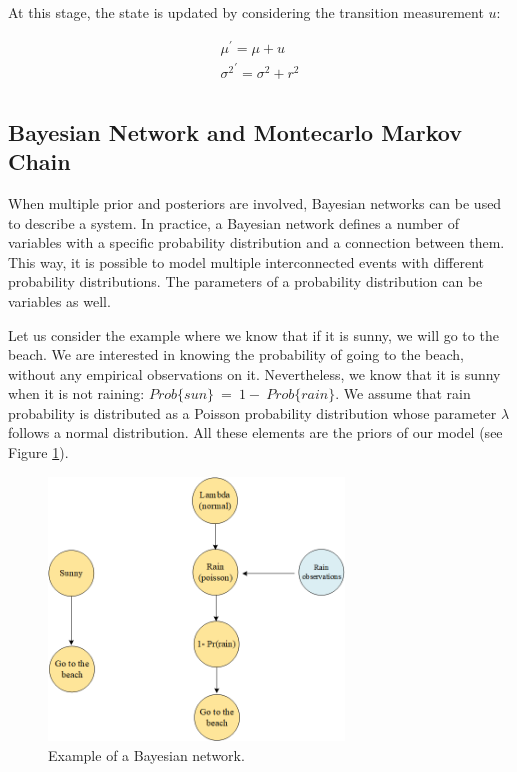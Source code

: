 At this stage, the state is updated by considering the transition measurement $u$:

\begin{equation}
\begin{split}
        \mu^\prime=\mu+u\\
        {\sigma^2}^\prime=\sigma^2+r^2\\
\end{split}
\label{eq_kalmanFilter2}
\end{equation}

\subsection{Bayesian Network and Montecarlo Markov Chain}

When multiple prior and posteriors are involved, Bayesian networks can be used to describe a system. In practice, a Bayesian network defines a number of variables with a specific probability distribution and a connection between them. This way, it is possible to model multiple interconnected events with different probability distributions. The parameters of a probability distribution can be variables as well.\par

Let us consider the example where we know that if it is sunny, we will go to the beach. We are interested in knowing the probability of going to the beach, without any empirical observations on it. Nevertheless, we know that it is sunny when it is not raining: $Prob\{sun\}\ =\ 1-\ Prob\{rain\}$. We assume that rain probability is distributed as a Poisson probability distribution whose parameter $\lambda$ follows a normal distribution. All these elements are the priors of our model (see Figure \ref{fig_bayesianNetwork}). 

\begin{figure}[hbt!]
\centering
\includegraphics[width=0.7\textwidth]{SectionLetsMath/nonLinearMethods_fig/fig_bayesianNetwork.png}
\captionsetup{type=figure}
\caption{Example of a Bayesian network.}
\label{fig_bayesianNetwork}
\end{figure}

